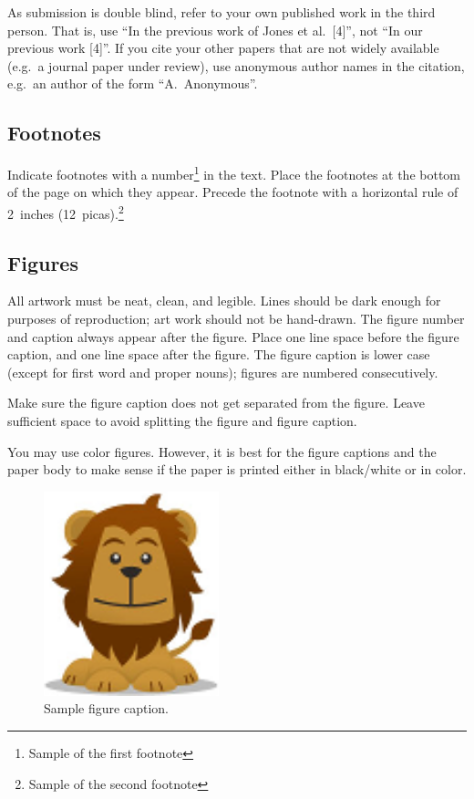 \documentclass{article} %
\begin{document}
As submission is double blind, refer to your own published work in the 
third person. That is, use ``In the previous work of Jones et al.\ [4]'',
not ``In our previous work [4]''. If you cite your other papers that
are not widely available (e.g.\ a journal paper under review), use
anonymous author names in the citation, e.g.\ an author of the
form ``A.\ Anonymous''. 


\subsection{Footnotes}

Indicate footnotes with a number\footnote{Sample of the first footnote} in the
text. Place the footnotes at the bottom of the page on which they appear.
Precede the footnote with a horizontal rule of 2~inches
(12~picas).\footnote{Sample of the second footnote}

\subsection{Figures}

All artwork must be neat, clean, and legible. Lines should be dark
enough for purposes of reproduction; art work should not be
hand-drawn. The figure number and caption always appear after the
figure. Place one line space before the figure caption, and one line
space after the figure. The figure caption is lower case (except for
first word and proper nouns); figures are numbered consecutively.

Make sure the figure caption does not get separated from the figure.
Leave sufficient space to avoid splitting the figure and figure caption.

You may use color figures. 
However, it is best for the
figure captions and the paper body to make sense if the paper is printed
either in black/white or in color.
\begin{figure}[h]
\begin{center}
\includegraphics[width=2in]{logo.png}
\end{center}
\caption{Sample figure caption.}
\end{figure}
\end{document}
